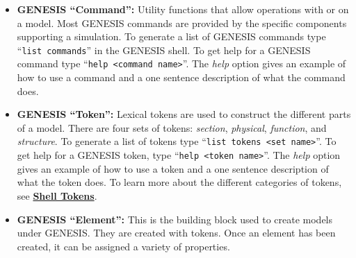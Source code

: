 \documentclass[12pt]{article}
\begin{document}
\begin{itemize}
\item {\bf GENESIS ``Command'':} Utility functions that allow operations with or on a model. Most GENESIS commands are provided by the specific components supporting a simulation. To generate a list of GENESIS commands type ``{\tt list commands}'' in the GENESIS shell. To get help for a GENESIS command type ``{\tt help <command name>}''. The {\it help} option gives an example of how to use a command and a one sentence description of what the command does.

\item {\bf GENESIS ``Token'':}  Lexical tokens are used to construct the different parts of a model. There are four sets of tokens:  {\it section}, {\it physical}, {\it function}, and {\it structure}. To generate a list of tokens type ``{\tt list tokens <set name>}''. To get help for a GENESIS token, type ``{\tt help <token name>}''. The {\it help} option gives an example of how to use a token and a one sentence description of what the token does. To learn more about the different categories of tokens, see \href{../shell-tokens/shell-tokens.tex}{\bf Shell Tokens}.

\item{\bf GENESIS ``Element'':} This is the building block used to create models under GENESIS. They are created with tokens. Once an element has been created, it can be assigned a variety of properties.

\end{itemize}
\end{document}
